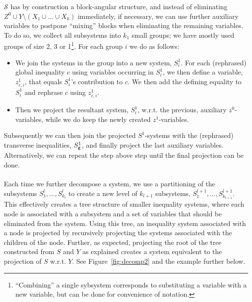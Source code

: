 $\mathcal{S}$ has by construction a block-angular structure, and instead of eliminating $Z^0\cup Y\setminus(X_1\cup\ldots\cup X_k)$ immediately, if necessary, we can use further auxiliary variables to postpone ``mixing'' blocks when eliminating the remaining variables. 
To do so, we collect all subsystems into $k_1$ small groups; we have mostly used groups of size 2, 3 or 1\footnote{``Combining'' a single sybsystem corresponds to substituting a variable with a new variable, but can be done for convenience of notation.}.
For each group $i$ we do as follows:
\begin{itemize}\itemsep0em
\item We join the systems in the group into a new system, $S^1_i$. For each (rephrased) global inequality $c$ using variables occurring in $S^1_i$, we then define a variable, $z^1_{c,i}$, that equals $S^1_i$'s contribution to $c$. We then add the defining equality to $S^1_i$ and rephrase $c$ using $z^1_{c,i}$.

\item Then we project the resultant system, $S^1_i$, w.r.t. the previous, auxiliary $z^0$-variables, while we do keep the newly created $z^1$-variables.
\end{itemize} 
Subsequently we can then join the projected $S^1$-systems with the (rephrased) transverse inequalities, $S_{\texttt{g}}^1$, and finally project the last auxiliary variables. Alternatively, we can repeat the step above step until the final projection can be done. 
\\\\
Each time we further decompose a system, we use a partitioning of the subsystems $S^l_1, \ldots, S^l_{k_l}$ to create a new level of $k_{l+1}$ subsystems, $S^{l+1}_1,\ldots, S^{l+1}_{k_{l+1}}$. This effectively creates a tree structure of smaller inequality systems, where each node is associated with a subsystem and a set of variables that should be eliminated from the system. 
Using this tree, an inequality system associated with a node is projected by recursively projecting the systems associated with the children of the node. Further, as expected, projecting the root of the tree constructed from $S$ and $Y$ as explained creates a system equivalent to the projection of $S$ w.r.t. $Y$. See Figure~\ref{fig:decomp2} and the example further below.

